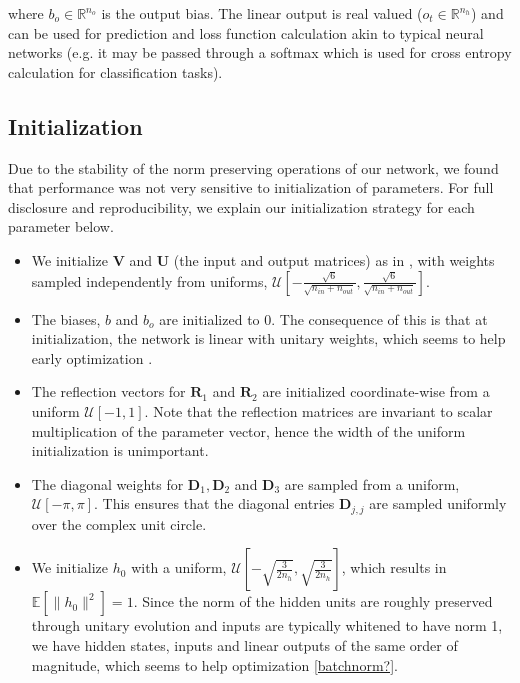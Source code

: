 \documentclass{article} %
\newcommand{\matr}[1]{\mathbf{#1}}
\newcommand\RR{\mathbb{R}}
\begin{document}
where $b_o \in \RR^{n_o}$ is the output bias. 
The linear output is real valued ($o_t \in \RR^{n_h}$) and can be used for prediction and loss function 
calculation akin to typical neural networks (e.g. it may be passed through a softmax which is used for 
cross entropy calculation for classification tasks).


\subsection{Initialization}

Due to the stability of the norm preserving operations of our network, we found that performance was
not very sensitive to initialization of parameters.
For full disclosure and reproducibility, we explain our initialization strategy for each parameter below.

\begin{itemize}
  \item We initialize $\matr{V}$ and $\matr{U}$ (the input and output matrices) as in \cite{Glorotinit},
  with weights sampled independently from uniforms, $\mathcal{U}\left[-\frac{\sqrt{6}}{\sqrt{n_{in}+ n_{out}}}, \frac{\sqrt{6}}{\sqrt{n_{in}+ n_{out}}}\right]$.
  \item The biases, $b$ and $b_o$ are initialized to 0. The consequence of this is that at initialization, 
    the network is linear with unitary weights, which seems to help early optimization \citep{Saxe2014}.
  \item The reflection vectors for $\matr{R}_1$ and $\matr{R}_2$ are initialized coordinate-wise from a 
  uniform $\mathcal{U}[-1, 1]$. Note that the reflection matrices are invariant to scalar multiplication 
  of the parameter vector, hence the width of the uniform initialization is unimportant.
  \item The diagonal weights for $\matr{D}_1, \matr{D}_2$ and $\matr{D}_3$ are sampled 
  from a uniform, $\mathcal{U}[-\pi, \pi]$. This ensures that the diagonal entries $\matr{D}_{j,j}$
  are sampled uniformly over the complex unit circle.
  \item We initialize $h_0$ with a uniform, 
  $\mathcal{U}\left[-\sqrt{\frac{3}{2n_h}}, \sqrt{\frac{3}{2n_h}} \right]$, 
  which results in $\mathbb{E}\left[\|h_0\|^2\right] = 1$. Since the norm of the hidden units are roughly 
  preserved through unitary evolution and inputs are typically whitened to have norm 1, 
  we have hidden states, inputs and linear outputs of the same order of magnitude, which seems to
  help optimization \ref{batchnorm?}.
\end{itemize}
\end{document}
